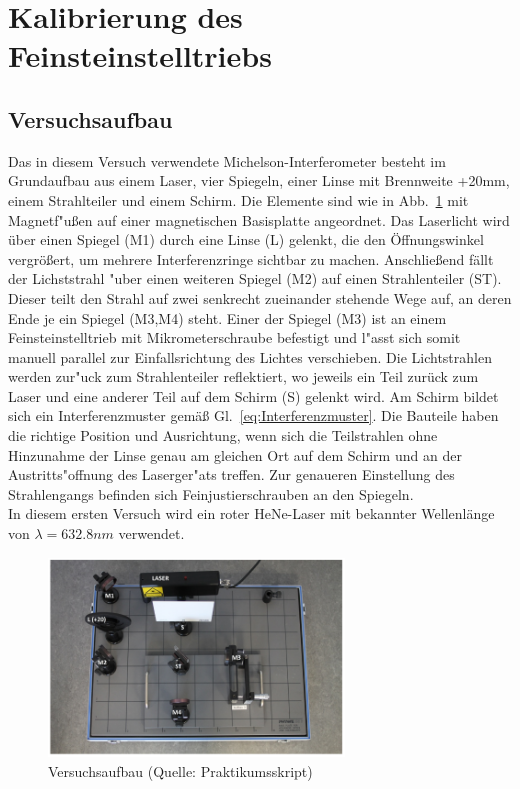 \documentclass[12pt,a4paper]{article}
\begin{document}
\section{Kalibrierung des Feinsteinstelltriebs}

\subsection{Versuchsaufbau}
Das in diesem Versuch verwendete Michelson-Interferometer besteht im Grundaufbau aus einem Laser, vier Spiegeln, einer Linse mit Brennweite +20mm, einem Strahlteiler und einem Schirm. Die Elemente sind wie in Abb.~\ref{Aufbau} mit Magnetf"u\ss en auf einer magnetischen Basisplatte angeordnet.  
Das Laserlicht wird über einen Spiegel (M1) durch eine Linse (L) gelenkt, die den Öffnungswinkel vergrößert, um mehrere Interferenzringe sichtbar zu machen. Anschließend fällt der Lichststrahl "uber einen weiteren Spiegel (M2) auf einen Strahlenteiler (ST). Dieser teilt den Strahl auf zwei senkrecht zueinander stehende Wege auf, an deren Ende je ein Spiegel (M3,M4) steht. Einer der Spiegel (M3) ist an einem Feinsteinstelltrieb mit Mikrometerschraube befestigt und l"asst sich somit manuell parallel zur Einfallsrichtung des Lichtes verschieben. Die Lichtstrahlen werden zur"uck zum Strahlenteiler reflektiert, wo jeweils ein Teil zurück zum Laser und eine anderer Teil auf dem Schirm (S) gelenkt wird. Am Schirm bildet sich ein Interferenzmuster gemäß Gl.~\eqref{eq:Interferenzmuster}.
Die Bauteile haben die richtige Position und Ausrichtung, wenn sich die Teilstrahlen ohne Hinzunahme der Linse genau am gleichen Ort auf dem Schirm und an der Austritts"offnung des Laserger"ats treffen. Zur genaueren Einstellung des Strahlengangs befinden sich Feinjustierschrauben an den Spiegeln.\\ 
In diesem ersten Versuch wird ein roter HeNe-Laser mit bekannter Wellenlänge von $\lambda=632.8nm$ verwendet.
\begin{figure}[H]
	\centering
	\includegraphics[width=0.7\textwidth]{Aufbau.png}
	\caption{Versuchsaufbau (Quelle: Praktikumsskript)}
	\label{Aufbau}
\end{figure}
\end{document}
